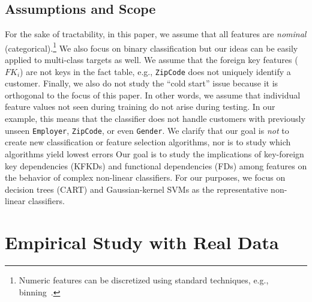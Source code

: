 \documentclass[sigconf]{acmart}
\begin{document}
\subsection{Assumptions and Scope}
For the sake of tractability, in this paper, we assume that all features are \textit{nominal} (categorical).\footnote{Numeric features can be discretized 
using standard techniques, e.g., binning~\cite{mitchell}.} We also focus on binary classification but our ideas can be easily applied to multi-class targets as well.
We assume that the foreign key features ($FK_i$) are not keys in the fact table, e.g., \texttt{ZipCode} does not uniquely identify a customer.
Finally, we also do not study the ``cold start'' issue because it is orthogonal to the focus of this paper. 
In other words, we assume that individual feature values not seen during training do not arise during testing. 
In our example, this means that the classifier does not handle customers with previously unseen \texttt{Employer}, \texttt{ZipCode}, or even \texttt{Gender}. 
We clarify that our goal is \textit{not} to create new classification or feature selection algorithms, nor is to study which algorithms yield lowest errors
Our goal is to study the implications of key-foreign key dependencies (KFKDs) and functional dependencies (FDs) among features on the behavior of complex non-linear classifiers.
For our purposes, we focus on decision trees (CART) and Gaussian-kernel SVMs as the representative non-linear classifiers.



\section{Empirical Study with Real Data}
\end{document}
